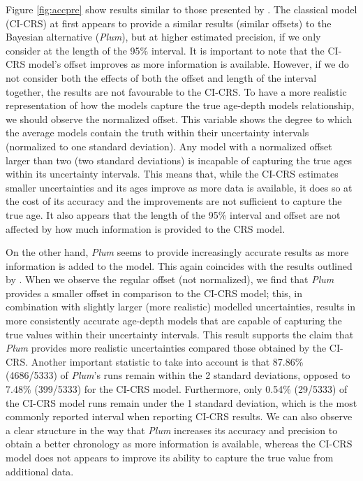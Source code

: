 \documentclass [10pt] {article}
\begin{document}
Figure \ref{fig:accpre} show results similar to those presented by \citet{Blaauw2018}. 
The classical model (CI-CRS) at first appears to provide a similar results (similar offsets) to the Bayesian alternative (\textit{Plum}), but at higher estimated precision, if we only consider at the length of the 95\% interval. 
It is important to note that the CI-CRS model's offset improves as more information is available.
However, if we do not consider both the effects of both the offset and length of the interval together, the results are not favourable to the CI-CRS. 
To have a more realistic representation of how the models capture the true age-depth models relationship, we should observe the normalized offset. 
This variable shows the degree to which the average models contain the truth within their uncertainty intervals (normalized to one standard deviation). 
Any model with a normalized offset larger than two (two standard deviations) is incapable of capturing the true ages within its uncertainty intervals.  
This means that, while the CI-CRS estimates smaller uncertainties and its ages improve as more data is available, it does so at the cost of its accuracy and the improvements are not sufficient to capture the true age.
It also appears that the length of the 95\% interval and offset are not affected by how much information is provided to the CRS model. 

On the other hand, \textit{Plum} seems to provide increasingly accurate results as more information is added to the model.
This again coincides with the results outlined by \citet{Blaauw2018}. 
When we observe the regular offset (not normalized), we find that \textit{Plum} provides a smaller offset in comparison to the CI-CRS model; this, in combination with slightly larger (more realistic) modelled uncertainties, results in more consistently accurate age-depth models that are capable of capturing the true values within their uncertainty intervals. 
This result supports the claim that \textit{Plum} provides more realistic uncertainties compared those obtained by the CI-CRS. 
Another important statistic to take into account is that 87.86\% (4686/5333) of \textit{Plum}'s runs remain within the 2 standard deviations, opposed to 7.48\% (399/5333) for the CI-CRS model. Furthermore, only 0.54\% (29/5333) of the CI-CRS model runs remain under the 1 standard deviation, which is the most commonly reported interval when reporting CI-CRS results.
We can also observe a clear structure in the way that \textit{Plum} increases its accuracy and precision to obtain a better chronology as more information is available, whereas the CI-CRS model does not appears to improve its ability to capture the true value from additional data. 
\end{document}
